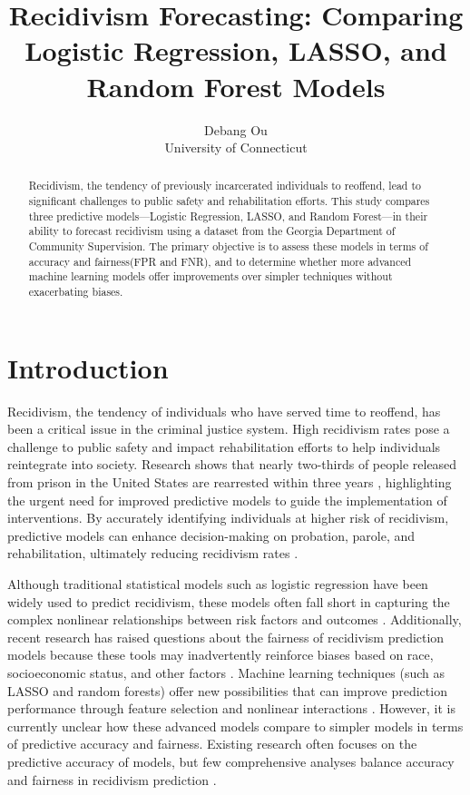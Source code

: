 \documentclass[12pt]{article}
\title{Recidivism Forecasting: Comparing Logistic Regression, LASSO, and Random Forest Models}
\author{Debang Ou\\
  University of Connecticut
}
\begin{document}
\maketitle

\begin{abstract}
Recidivism, the tendency of previously incarcerated individuals to reoffend, lead to significant challenges to public safety and rehabilitation efforts. This study compares three predictive models—Logistic Regression, LASSO, and Random Forest—in their ability to forecast recidivism using a dataset from the Georgia Department of Community Supervision. The primary objective is to assess these models in terms of accuracy and fairness(FPR and FNR), and to determine whether more advanced machine learning models offer improvements over simpler techniques without exacerbating biases.
\end{abstract}


\section{Introduction}
Recidivism, the tendency of individuals who have served time to reoffend, has been a critical issue in the criminal justice system. High recidivism rates pose a challenge to public safety and impact rehabilitation efforts to help individuals reintegrate into society. Research shows that nearly two-thirds of people released from prison in the United States are rearrested within three years \citep{Durose2014}, highlighting the urgent need for improved predictive models to guide the implementation of interventions. By accurately identifying individuals at higher risk of recidivism, predictive models can enhance decision-making on probation, parole, and rehabilitation, ultimately reducing recidivism rates \citep{Berk2009}.

Although traditional statistical models such as logistic regression have been widely used to predict recidivism, these models often fall short in capturing the complex nonlinear relationships between risk factors and outcomes \citep{James2013}. Additionally, recent research has raised questions about the fairness of recidivism prediction models because these tools may inadvertently reinforce biases based on race, socioeconomic status, and other factors \citep{Angwin2016, Chouldechova2017}. Machine learning techniques (such as LASSO and random forests) offer new possibilities that can improve prediction performance through feature selection and nonlinear interactions \citep{Hastie2015}. However, it is currently unclear how these advanced models compare to simpler models in terms of predictive accuracy and fairness. Existing research often focuses on the predictive accuracy of models, but few comprehensive analyses balance accuracy and fairness in recidivism prediction \citep{Berk2018}.
\end{document}
